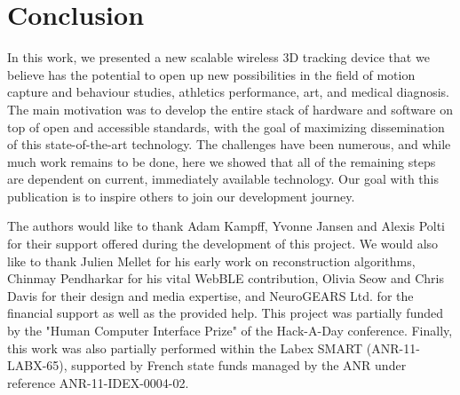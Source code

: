 \documentclass[sigchi]{acmart}
\begin{document}
\section{Conclusion}

In this work, we presented a new scalable wireless 3D tracking device that we believe has the potential to open up new possibilities in the field of motion capture and behaviour studies, athletics performance, art, and medical diagnosis. The main motivation was to develop the entire stack of hardware and software on top of open and accessible standards, with the goal of maximizing dissemination of this state-of-the-art technology. The challenges have been numerous, and while much work remains to be done, here we showed that all of the remaining steps are dependent on current, immediately available technology. Our goal with this publication is to inspire others to join our development journey.

\begin{acks}
The authors would like to thank Adam Kampff, Yvonne Jansen and Alexis Polti for their support offered during the development of this project. We would also like to thank Julien Mellet for his early work on reconstruction algorithms, Chinmay Pendharkar for his vital WebBLE contribution, Olivia Seow and Chris Davis for their design and media expertise, and NeuroGEARS Ltd. for the financial support as well as the provided help. This project was partially funded by the "Human Computer Interface Prize" of the Hack-A-Day conference. Finally, this work was also partially performed within the Labex SMART (ANR-11-LABX-65), supported by French state funds managed by the ANR under reference ANR-11-IDEX-0004-02.
\end{acks}




\end{document}
